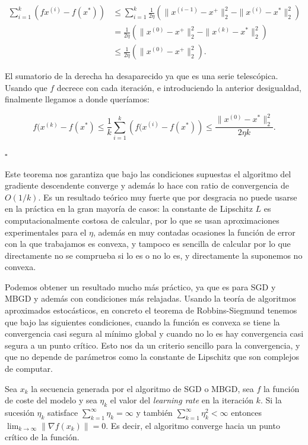 \begin{align*}
    \sum^k_{i=1} \left ( fx^{(i)} - f(x^*) \right ) &\leq \sum^k_{i=1} \frac{1}{2\eta}  \left ( \| x^{(i-1)} - x^+ \|^2_2 -  \| x^{(i)} - x^* \|^2_2 \right ) \\ 
    &=\frac{1}{2\eta}  \left ( \| x^{(0)} - x^+ \|^2_2 -  \| x^{(k)} - x^* \|^2_2 \right ) \\ 
    &\leq \frac{1}{2\eta}  \left ( \| x^{(0)} - x^+ \|^2_2 \right ). 
\end{align*}

El sumatorio de la derecha ha desaparecido ya que es una serie telescópica. Usando que $f$ decrece con cada iteración, e introduciendo la anterior desigualdad, finalmente llegamos a donde queríamos:

$$f(x^{(k)} - f(x^*) \leq \frac{1}{k} \sum ^k _{i=1} \left ( f(x^{(i)} - f(x^*) \right ) \leq \frac{\|x^{(0)}-x^* \|^2_2}{2\eta k} .$$


\begin{flushright}
    $\square$
\end{flushright} 


Este teorema nos garantiza que bajo las condiciones supuestas el algoritmo del gradiente descendente converge y además lo hace con ratio de convergencia de $O(1/k)$. Es un resultado teórico muy fuerte que por desgracia no puede usarse en la práctica en la gran mayoría de casos: la constante de Lipschitz $L$ es computacionalmente costosa de calcular, por lo que se usan aproximaciones experimentales para el $\eta$, además en muy contadas ocasiones la función de error con la que trabajamos es convexa, y tampoco es sencilla de calcular por lo que directamente no se comprueba si lo es o no lo es, y directamente la suponemos no convexa. 

Podemos obtener un resultado mucho más práctico, ya que es para SGD y MBGD y además con condiciones más relajadas. Usando la teoría de algoritmos aproximados estocásticos, en concreto el teorema de Robbins-Siegmund tenemos que bajo las siguientes condiciones, cuando la función es convexa se tiene la convergencia casi segura al mínimo global y cuando no lo es hay convergencia casi segura a un punto crítico. Esto nos da un criterio sencillo para la convergencia, y que no depende de parámetros como la constante de Lipschitz que son complejos de computar.


\begin{proposicion}\label{prop:convsgd}
    Sea ${x_k}$ la secuencia generada por el algoritmo de SGD o MBGD, sea $f$ la función de coste del modelo y sea $\eta_k$ el valor del \textit{learning rate} en la iteración $k$. Si la sucesión ${\eta_k}$ satisface $\sum^\infty_{k=1} \eta_k = \infty$ y también $\sum_{k=1}^\infty \eta_k ^2 < \infty$  entonces $\lim_{k\rightarrow\infty} \| \nabla f(x_k) \| =0$. Es decir, el algoritmo converge hacia un punto crítico de la función.%
\end{proposicion}

